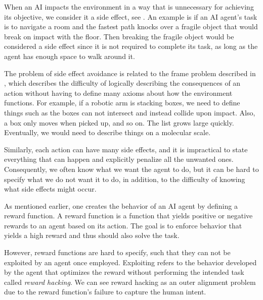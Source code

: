 \documentclass[12pt,A4]{report}
\theoremstyle{definition}
\begin{document}
When an AI impacts the environment in a way that is unnecessary for achieving its objective, we consider it a side effect, see \citet{Amodei}. An example is if an AI agent's task is to navigate a room and the fastest path knocks over a fragile object that would break on impact with the floor. Then breaking the fragile object would be considered a side effect since it is not required to complete its task, as long as the agent has enough space to walk around it. 

The problem of side effect avoidance is related to the frame problem described in \citet{Mc69}, which describes the difficulty of logically describing the consequences of an action without having to define many axioms about how the environment functions. For example, if a robotic arm is stacking boxes, we need to define things such as the boxes can not intersect and instead collide upon impact. Also, a box only moves when picked up, and so on. The list grows large quickly. Eventually, we would need to describe things on a molecular scale.

Similarly, each action can have many side effects, and it is impractical to state everything that can happen and explicitly penalize all the unwanted ones. Consequently, we often know what we want the agent to do, but it can be hard to specify what we do not want it to do, in addition, to the difficulty of knowing what side effects might occur.


As mentioned earlier, one creates the behavior of an AI agent by defining a reward function. A reward function is a function that yields positive or negative rewards to an agent based on its action. The goal is to enforce behavior that yields a high reward and thus should also solve the task. 

However, reward functions are hard to specify, such that they can not be exploited by an agent once employed. Exploiting refers to the behavior developed by the agent that optimizes the reward without performing the intended task called \textit{reward hacking}. We can see reward hacking as an outer alignment problem due to the reward function's failure to capture the human intent.
\end{document}
